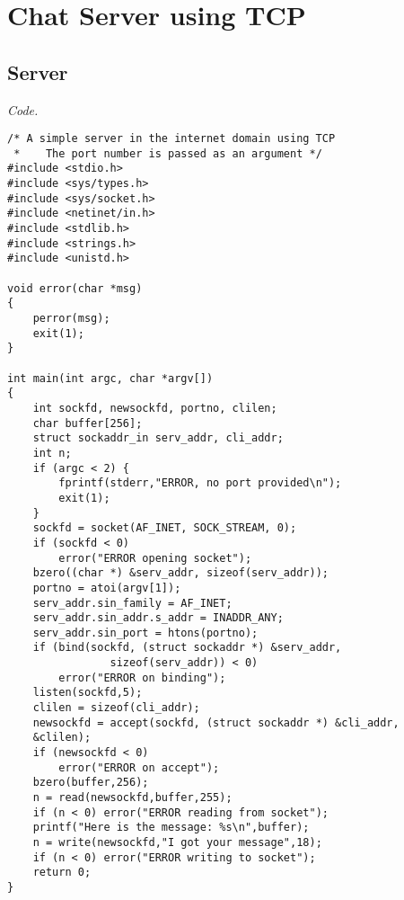 \documentclass[12pt]{article}
\date{ }
\begin{document}
\tableofcontents

\newpage

\setlength{\fboxrule}{.5mm}\setlength{\fboxsep}{1.2mm}
\newlength{\boxlength}\setlength{\boxlength}{\textwidth}
\addtolength{\boxlength}{-4mm}
\begin{center}\end{center}
\vspace{5mm}

\section{Chat Server using TCP}

\subsection{Server}

\textit{Code.}

\begin{lstlisting}
/* A simple server in the internet domain using TCP
 *    The port number is passed as an argument */
#include <stdio.h>
#include <sys/types.h> 
#include <sys/socket.h>
#include <netinet/in.h>
#include <stdlib.h>
#include <strings.h>
#include <unistd.h>

void error(char *msg)
{
	perror(msg);
	exit(1);
}

int main(int argc, char *argv[])
{
	int sockfd, newsockfd, portno, clilen;
	char buffer[256];
	struct sockaddr_in serv_addr, cli_addr;
	int n;
	if (argc < 2) {
		fprintf(stderr,"ERROR, no port provided\n");
		exit(1);
	}
	sockfd = socket(AF_INET, SOCK_STREAM, 0);
	if (sockfd < 0) 
		error("ERROR opening socket");
	bzero((char *) &serv_addr, sizeof(serv_addr));
	portno = atoi(argv[1]);
	serv_addr.sin_family = AF_INET;
	serv_addr.sin_addr.s_addr = INADDR_ANY;
	serv_addr.sin_port = htons(portno);
	if (bind(sockfd, (struct sockaddr *) &serv_addr,
				sizeof(serv_addr)) < 0) 
		error("ERROR on binding");
	listen(sockfd,5);
	clilen = sizeof(cli_addr);
	newsockfd = accept(sockfd, (struct sockaddr *) &cli_addr, 
	&clilen);
	if (newsockfd < 0) 
		error("ERROR on accept");
	bzero(buffer,256);
	n = read(newsockfd,buffer,255);
	if (n < 0) error("ERROR reading from socket");
	printf("Here is the message: %s\n",buffer);
	n = write(newsockfd,"I got your message",18);
	if (n < 0) error("ERROR writing to socket");
	return 0; 
}

\end{lstlisting}
\end{document}
